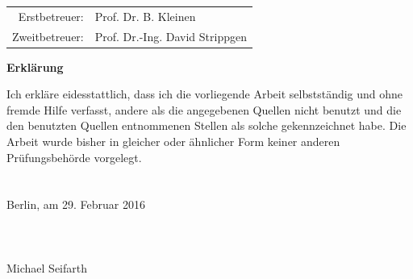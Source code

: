 \noindent \begin{center}
\medskip{}
\begin{tabular}{rl}
Erstbetreuer: & Prof. Dr. B. Kleinen\tabularnewline
Zweitbetreuer: & Prof. Dr.-Ing. David Strippgen\tabularnewline
\end{tabular}
\par\end{center}

\newpage{}

\hfill\break
\hfill\break
\hfill\break
\hfill\break
\hfill\break
\hfill\break
\hfill\break
\hfill\break
\hfill\break
\hfill\break
\hfill\break

\textbf{Erklärung}

Ich erkläre eidesstattlich, dass ich die vorliegende Arbeit selbstständig und
ohne fremde Hilfe verfasst, andere als die angegebenen Quellen nicht benutzt
und die den benutzten Quellen entnommenen Stellen als solche gekennzeichnet habe.
Die Arbeit wurde bisher in gleicher oder ähnlicher Form keiner
anderen Prüfungsbehörde vorgelegt.\\
\\
\\
Berlin, am 29. Februar 2016\\
\\
\\
\\
Michael Seifarth

\newpage{}